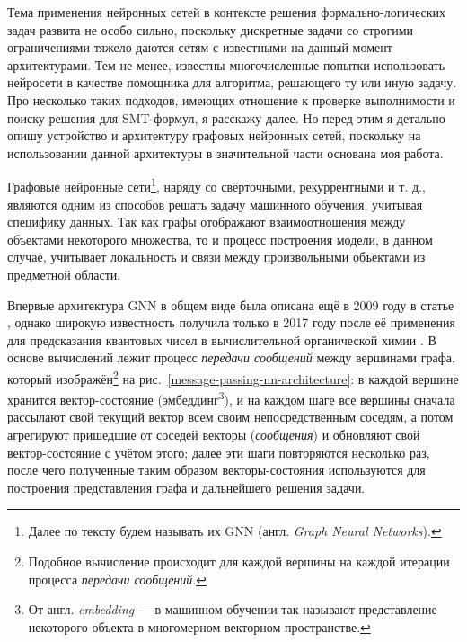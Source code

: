 
Тема применения нейронных сетей в контексте решения формально-логических задач развита не особо сильно, поскольку дискретные задачи со строгими ограничениями тяжело даются сетям с известными на данный момент архитектурами. Тем не менее, известны многочисленные попытки использовать нейросети в качестве помощника для алгоритма, решающего ту или иную задачу. Про несколько таких подходов, имеющих отношение к проверке выполнимости и поиску решения для SMT-формул, я расскажу далее. Но перед этим я детально опишу устройство и архитектуру графовых нейронных сетей, поскольку на использовании данной архитектуры в значительной части основана моя работа.

 \label{gnn-architecture}

Графовые нейронные сети\footnote{Далее по тексту будем называть их GNN (англ. \textit{Graph Neural Networks}).}, наряду со свёрточными, рекуррентными и т. д., являются одним из способов решать задачу машинного обучения, учитывая специфику данных. Так как графы отображают взаимоотношения между объектами некоторого множества, то и процесс построения модели, в данном случае, учитывает локальность и связи между произвольными объектами из предметной области.

Впервые архитектура GNN в общем виде была описана ещё в 2009 году в статье \cite{gnn-intro-paper}, однако широкую известность получила только в 2017 году после её применения для предсказания квантовых чисел в вычислительной органической химии \cite{gnn-quantum-chemistry-paper}. В основе вычислений лежит процесс \textit{передачи сообщений} между вершинами графа, который изображён\footnote{Подобное вычисление происходит для каждой вершины на каждой итерации процесса \textit{передачи сообщений}.} на рис.~\ref{message-passing-nn-architecture}: в каждой вершине хранится вектор-состояние (эмбеддинг\footnote{От англ. \textit{embedding} --- в машинном обучении так называют представление некоторого объекта в многомерном векторном пространстве.}), и на каждом шаге все вершины сначала рассылают свой текущий вектор всем своим непосредственным соседям, а потом агрегируют пришедшие от соседей векторы (\textit{сообщения}) и обновляют свой вектор-состояние с учётом этого; далее эти шаги повторяются несколько раз, после чего полученные таким образом векторы-состояния используются для построения представления графа и дальнейшего решения задачи.

